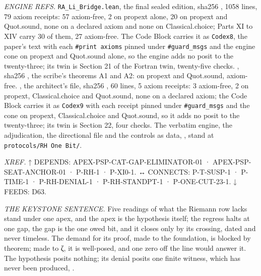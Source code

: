 \documentclass[10pt,twocolumn]{article}
\begin{document}
\emph{ENGINE REFS.} \texttt{RA\_Li\_Bridge.lean}, the final sealed
edition, sha256
\texttt{},
1058 lines, 79 axiom receipts: 57 axiom-free, 2 on propext alone, 20 on
propext and Quot.sound, none on a declared axiom and none on
Classical.choice; Parts XI to XIV carry 30 of them, 27 axiom-free. The
Code Block carries it as \texttt{Codex8}, the paper's text with each
\texttt{\#print\ axioms} pinned under \texttt{\#guard\_msgs} and the
engine cone \texttt{} on propext and
Quot.sound alone, so the engine adds no posit to the twenty-three; its
twin is Section 21 of the Fortran twin, twenty-five checks.
\texttt{}, sha256
\texttt{},
the scribe's theorems A1 and A2:
\texttt{} on propext and Quot.sound,
\texttt{} axiom-free.
\texttt{}, the architect's file, sha256
\texttt{},
60 lines, 5 axiom receipts: 3 axiom-free, 2 on propext, Classical.choice
and Quot.sound, none on a declared axiom; the Code Block carries it as
\texttt{Codex9} with each receipt pinned under \texttt{\#guard\_msgs}
and the cone \texttt{} on propext,
Classical.choice and Quot.sound, so it adds no posit to the
twenty-three; its twin is Section 22, four checks. The verbatim engine,
the adjudication, the directional file and the controls as data,
\texttt{}, stand at
\texttt{protocols/RH\ One\ Bit/}.

\emph{XREF.} ↑ DEPENDS: APEX-PSP-CAT-GAP-ELIMINATOR-01 ·
APEX-PSP-SEAT-ANCHOR-01 · P-RH-1 · P-XI0-1. ↔ CONNECTS: P-T-SUSP-1 ·
P-TIME-1 · P-RH-DENIAL-1 · P-RH-STANDPT-1 · P-ONE-CUT-23-1. ↓ FEEDS:
D63.

\emph{THE KEYSTONE SENTENCE.} Five readings of what the Riemann row
lacks stand under one apex, and the apex is the hypothesis itself; the
regress halts at one gap, the gap is the one owed bit, and it closes
only by its crossing, dated and never timeless. The demand for its
proof, made to the foundation, is blocked by theorem; made to ζ, it is
well-posed, and one zero off the line would answer it. The hypothesis
posits nothing; its denial posits one finite witness, which has never
been produced, \texttt{}.
\end{document}
